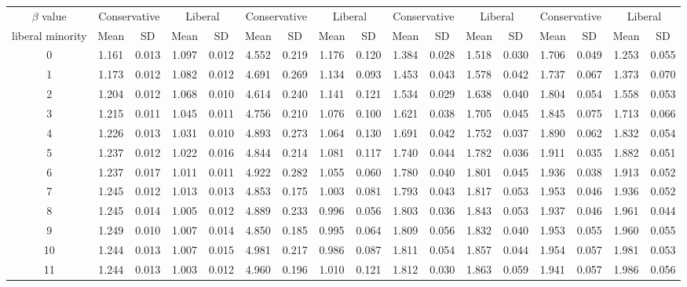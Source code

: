 \documentclass{article}
\begin{document}
\begin{table}[H]
{\begin{tabular}{|c|c|c|c|c|c|c|c|c|c|c|c|c|c|c|c|c|}
 $\beta$ value & \multicolumn{2}{|c|}{Conservative} & \multicolumn{2}{|c|}{Liberal} 
& \multicolumn{2}{|c|}{Conservative} & \multicolumn{2}{|c|}{Liberal} & \multicolumn{2}{|c|}{Conservative} & \multicolumn{2}{|c|}{Liberal} 
& \multicolumn{2}{|c|}{Conservative} & \multicolumn{2}{|c|}{Liberal}\\
 liberal minority & Mean & SD & Mean & SD & Mean & SD & Mean & SD & Mean & SD & Mean & SD & Mean & SD & Mean & SD\\
 \hline
   0 & 1.161 & 0.013 & 1.097 & 0.012 & 4.552 & 0.219 & 1.176 & 0.120 & 1.384 & 0.028 & 1.518 & 0.030 & 1.706 & 0.049 & 1.253 & 0.055 \\ 
     1 & 1.173 & 0.012 & 1.082 & 0.012 & 4.691 & 0.269 & 1.134 & 0.093 & 1.453 & 0.043 & 1.578 & 0.042 & 1.737 & 0.067 & 1.373 & 0.070 \\ 
     2 & 1.204 & 0.012 & 1.068 & 0.010 & 4.614 & 0.240 & 1.141 & 0.121 & 1.534 & 0.029 & 1.638 & 0.040 & 1.804 & 0.054 & 1.558 & 0.053 \\ 
     3 & 1.215 & 0.011 & 1.045 & 0.011 & 4.756 & 0.210 & 1.076 & 0.100 & 1.621 & 0.038 & 1.705 & 0.045 & 1.845 & 0.075 & 1.713 & 0.066 \\ 
     4 & 1.226 & 0.013 & 1.031 & 0.010 & 4.893 & 0.273 & 1.064 & 0.130 & 1.691 & 0.042 & 1.752 & 0.037 & 1.890 & 0.062 & 1.832 & 0.054 \\ 
     5 & 1.237 & 0.012 & 1.022 & 0.016 & 4.844 & 0.214 & 1.081 & 0.117 & 1.740 & 0.044 & 1.782 & 0.036 & 1.911 & 0.035 & 1.882 & 0.051 \\ 
     6 & 1.237 & 0.017 & 1.011 & 0.011 & 4.922 & 0.282 & 1.055 & 0.060 & 1.780 & 0.040 & 1.801 & 0.045 & 1.936 & 0.038 & 1.913 & 0.052 \\ 
     7 & 1.245 & 0.012 & 1.013 & 0.013 & 4.853 & 0.175 & 1.003 & 0.081 & 1.793 & 0.043 & 1.817 & 0.053 & 1.953 & 0.046 & 1.936 & 0.052 \\ 
     8 & 1.245 & 0.014 & 1.005 & 0.012 & 4.889 & 0.233 & 0.996 & 0.056 & 1.803 & 0.036 & 1.843 & 0.053 & 1.937 & 0.046 & 1.961 & 0.044 \\ 
     9 & 1.249 & 0.010 & 1.007 & 0.014 & 4.850 & 0.185 & 0.995 & 0.064 & 1.809 & 0.056 & 1.832 & 0.040 & 1.953 & 0.055 & 1.960 & 0.055 \\ 
    10 & 1.244 & 0.013 & 1.007 & 0.015 & 4.981 & 0.217 & 0.986 & 0.087 & 1.811 & 0.054 & 1.857 & 0.044 & 1.954 & 0.057 & 1.981 & 0.053 \\ 
    11 & 1.244 & 0.013 & 1.003 & 0.012 & 4.960 & 0.196 & 1.010 & 0.121 & 1.812 & 0.030 & 1.863 & 0.059 & 1.941 & 0.057 & 1.986 & 0.056 \\ 

\end{tabular}}
\end{table}
\end{document}
